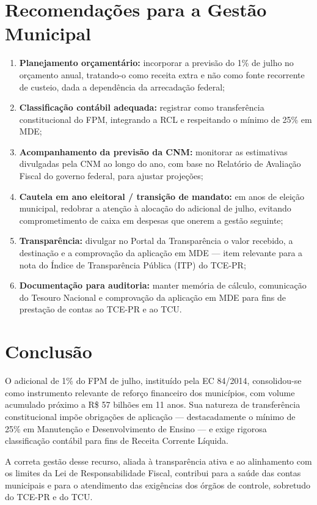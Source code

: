 \documentclass[12pt,a4paper]{article}
\begin{document}
\section{Recomendações para a Gestão Municipal}

\begin{enumerate}[leftmargin=2.5em]
  \item \textbf{Planejamento orçamentário:} incorporar a previsão do 1\% de julho no orçamento anual, tratando-o como receita extra e não como fonte recorrente de custeio, dada a dependência da arrecadação federal;
  \item \textbf{Classificação contábil adequada:} registrar como transferência constitucional do FPM, integrando a RCL e respeitando o mínimo de 25\% em MDE;
  \item \textbf{Acompanhamento da previsão da CNM:} monitorar as estimativas divulgadas pela CNM ao longo do ano, com base no Relatório de Avaliação Fiscal do governo federal, para ajustar projeções;
  \item \textbf{Cautela em ano eleitoral / transição de mandato:} em anos de eleição municipal, redobrar a atenção à alocação do adicional de julho, evitando comprometimento de caixa em despesas que onerem a gestão seguinte;
  \item \textbf{Transparência:} divulgar no Portal da Transparência o valor recebido, a destinação e a comprovação da aplicação em MDE --- item relevante para a nota do Índice de Transparência Pública (ITP) do TCE-PR;
  \item \textbf{Documentação para auditoria:} manter memória de cálculo, comunicação do Tesouro Nacional e comprovação da aplicação em MDE para fins de prestação de contas ao TCE-PR e ao TCU.
\end{enumerate}

\section{Conclusão}

O adicional de 1\% do FPM de julho, instituído pela EC 84/2014, consolidou-se como instrumento relevante de reforço financeiro dos municípios, com volume acumulado próximo a R\$ 57 bilhões em 11 anos. Sua natureza de transferência constitucional impõe obrigações de aplicação --- destacadamente o mínimo de 25\% em Manutenção e Desenvolvimento de Ensino --- e exige rigorosa classificação contábil para fins de Receita Corrente Líquida.

A correta gestão desse recurso, aliada à transparência ativa e ao alinhamento com os limites da Lei de Responsabilidade Fiscal, contribui para a saúde das contas municipais e para o atendimento das exigências dos órgãos de controle, sobretudo do TCE-PR e do TCU.
\end{document}
